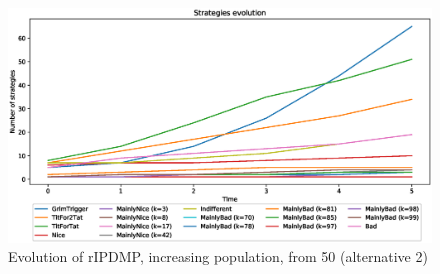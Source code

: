 \documentclass[journal,10pt,twoside]{IEEEtran}
\begin{document}
\begin{figure}
    \centering
    \includegraphics[width=.7\columnwidth]{../img/ripdmp-incr/alt2/ripdmp-evolution-increasing-pop-50}
    \caption{Evolution of rIPDMP, increasing population, from 50 (alternative 2)}
    \label{fig:incrRa2}
\end{figure}



\end{document}
